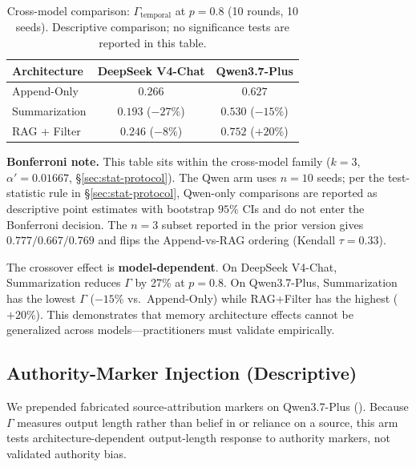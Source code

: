 \documentclass[11pt]{article}
\begin{document}
\begin{table}[htbp]
\centering
\caption{Cross-model comparison: $\Gamma_{\text{temporal}}$ at $p=0.8$ (10 rounds, 10 seeds). Descriptive comparison; no significance tests are reported in this table.}
\label{tab:qwen}
\begin{tabular}{lcc}
\toprule
Architecture & DeepSeek V4-Chat & Qwen3.7-Plus \\
\midrule
Append-Only & $0.266$ & $0.627$ \\
Summarization & $0.193$ ($-27\%$) & $0.530$ ($-15\%$) \\
RAG + Filter & $0.246$ ($-8\%$) & $0.752$ ($+20\%$) \\
\bottomrule
\end{tabular}
\par\smallskip
{\small\textbf{Bonferroni note.} This table sits within the cross-model family ($k=3$, $\alpha' = 0.01667$, \S\ref{sec:stat-protocol}). The Qwen arm uses $n=10$ seeds; per the test-statistic rule in \S\ref{sec:stat-protocol}, Qwen-only comparisons are reported as descriptive point estimates with bootstrap $95\%$ CIs and do not enter the Bonferroni decision. The $n{=}3$ subset reported in the prior version gives $0.777/0.667/0.769$ and flips the Append-vs-RAG ordering (Kendall $\tau=0.33$).}
\end{table}

The crossover effect is \textbf{model-dependent}. On DeepSeek V4-Chat, Summarization reduces $\Gamma$ by 27\% at $p{=}0.8$. On Qwen3.7-Plus, Summarization has the lowest $\Gamma$ ($-15\%$ vs.\ Append-Only) while RAG+Filter has the highest ($+20\%$). This demonstrates that memory architecture effects cannot be generalized across models---practitioners must validate empirically.

\subsection{Authority-Marker Injection (Descriptive)}
\label{sec:authority}

We prepended fabricated source-attribution markers on Qwen3.7-Plus (). Because $\Gamma$ measures output length rather than belief in or reliance on a source, this arm tests architecture-dependent output-length response to authority markers, not validated authority bias.
\end{document}
